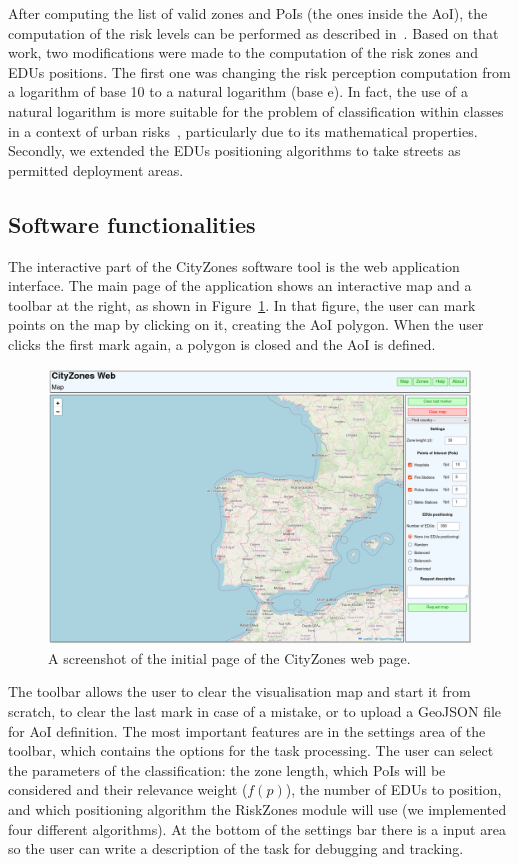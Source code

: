 \begin{refsection}
After computing the list of valid zones and PoIs (the ones inside the AoI), the computation of the risk levels can be performed as described in~\cite{riskzones}. Based on that work, two modifications were made to the computation of the risk zones and EDUs positions. The first one was changing the risk perception computation from a logarithm of base 10 to a natural logarithm (base $\mathrm{e}$). In fact, the use of a natural logarithm is more suitable for the problem of classification within classes in a context of urban risks~\cite{log1,log2}, particularly due to its mathematical properties. Secondly, we extended the EDUs positioning algorithms to take streets as permitted deployment areas.

\subsection{Software functionalities}

The interactive part of the CityZones software tool is the web application interface. The main page of the application shows an interactive map and a toolbar at the right, as shown in Figure~\ref{fig:web_map}. In that figure, the user can mark points on the map by clicking on it, creating the AoI polygon. When the user clicks the first mark again, a polygon is closed and the AoI is defined.

\begin{figure}[htb]
  \centering
  \includegraphics[width=.8\linewidth]{Chapters/4-CityZones/img/cityzones_map.png}
  \caption{A screenshot of the initial page of the CityZones web page.}\label{fig:web_map}
\end{figure}

The toolbar allows the user to clear the visualisation map and start it from scratch, to clear the last mark in case of a mistake, or to upload a GeoJSON file for AoI definition. The most important features are in the settings area of the toolbar, which contains the options for the task processing. The user can select the parameters of the classification: the zone length, which PoIs will be considered and their relevance weight ($f(p)$), the number of EDUs to position, and which positioning algorithm the RiskZones module will use (we implemented four different algorithms). At the bottom of the settings bar there is a input area so the user can write a description of the task for debugging and tracking.


\end{refsection}

